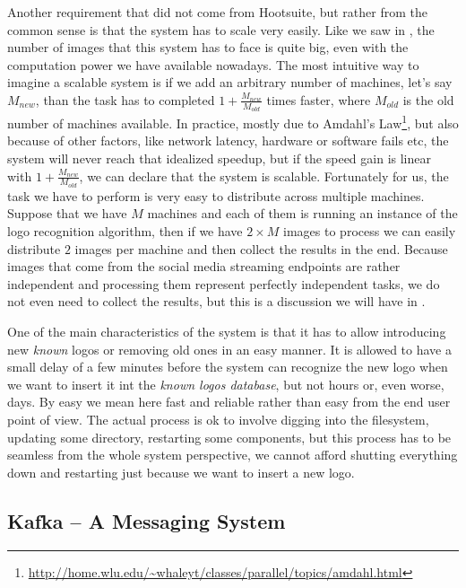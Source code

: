 Another requirement that did not come from Hootsuite, but rather from the
common sense is that the system has to scale very easily. Like we saw in
, the number of images that this
system has to face is quite big, even with the computation power we have
available nowadays. The most intuitive way to imagine a scalable system is if
we add an arbitrary number of machines, let's say \(M_{new}\), than the task has to
completed \(1 + \frac{M_{new}}{M_{old}}\) times faster, where \(M_{old}\) is the old number
of machines available. In practice, mostly due to Amdahl's
Law\footnote{\url{http://home.wlu.edu/~whaleyt/classes/parallel/topics/amdahl.html}},
but also because of other factors, like network latency, hardware or software
fails etc, the system will never reach that idealized speedup, but if the
speed gain is linear with \(1 + \frac{M_{new}}{M_{old}}\), we can declare that the
system is scalable. Fortunately for us, the task we have to perform is very
easy to distribute across multiple machines. Suppose that we have \(M\)
machines and each of them is running an instance of the logo recognition
algorithm, then if we have \(2 \times M\) images to process we can easily
distribute \(2\) images per machine and then collect the results in the end.
Because images that come from the social media streaming endpoints are rather
independent and processing them represent perfectly independent tasks, we do
not even need to collect the results, but this is a discussion we will have in
.

One of the main characteristics of the system is that it has to allow
introducing new \textit{known} logos or removing old ones in an easy manner.
It is allowed to have a small delay of a few minutes before the system can
recognize the new logo when we want to insert it
int the \textit{known logos database}, but not hours or, even worse,
days. By easy we mean here fast and reliable rather than easy from the end user point of
view. The actual process is ok to involve digging into the filesystem,
updating some directory, restarting some components, but this process has to
be seamless from the whole system perspective, we cannot afford shutting
everything down and restarting just because we want to insert a new logo.


\subsection{Kafka -- A Messaging System}

